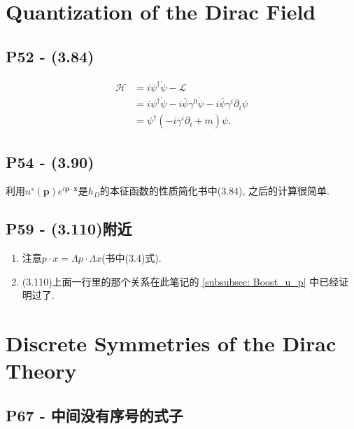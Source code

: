 \documentclass[10pt,b5paper,openany]{book}
\begin{document}
\section{Quantization of the Dirac Field}

\subsection{{P52} - (3.84)}
\begin{equation}
  \begin{aligned}
    \mathcal{H} &= i {\psi}^\dagger \dot{\psi} - \mathcal{L} \\
    &= i {\psi}^\dagger \dot{\psi} - i \bar{\psi} \gamma^0 \dot{\psi} - i \bar{\psi} \gamma^i \partial_i \psi \\
    &= {\psi}^\dagger (-i \gamma^i \partial_i + m) \psi. 
  \end{aligned}
\end{equation}

\begin{center}
\end{center}

\subsection{P54 - (3.90)}

利用$u^s(\mathbf{p})e^{i\mathbf{p} \cdot \mathbf{x}}$是$h_D$的本征函数的性质简化书中(3.84), 之后的计算很简单. 

\subsection{P59 - (3.110)附近}
\begin{enumerate}
  \item 注意$p\cdot x = \Lambda p\cdot \Lambda x$(书中(3.4)式).
  \item (3.110)上面一行里的那个关系在此笔记的 \ref{subsubsec: Boost_u_p} 中已经证明过了. 
\end{enumerate}

\section{Discrete Symmetries of the Dirac Theory}

\subsection{P67 - 中间没有序号的式子} 
\end{document}
